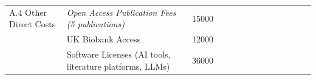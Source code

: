 \begin{table}[]
\begin{tabular}{llllrrrrcrrrrrr}
A.4 Other Direct Costs                                   & \multicolumn{2}{l}{\cellcolor[HTML]{FFFF99}\textit{Open Access Publication Fees (5 publications)}}              & \multicolumn{1}{r}{\cellcolor[HTML]{FFFF99}15000} & \cellcolor[HTML]{FFFF99}                              & \cellcolor[HTML]{FFFF99}\textit{}                     & \cellcolor[HTML]{FFFF99}\textit{}                     & \textit{}                                             & \cellcolor[HTML]{FFFF99}\textit{}                     & \cellcolor[HTML]{92D050}\textit{\textbf{}}                     & \cellcolor[HTML]{FFFF99}\textit{\textbf{}}                     & \cellcolor[HTML]{92D050}\textit{}                     & \cellcolor[HTML]{FFFF99}\textit{}                     & \cellcolor[HTML]{BFBFBF}\textit{\textbf{}}                        & \textit{\textbf{}}                                             \\
\rowcolor[HTML]{FFFF99} 
\cellcolor[HTML]{0070C0}{\color[HTML]{FFFFFF} \textbf{}} & \multicolumn{2}{l}{\cellcolor[HTML]{FFFF99}UK Biobank Access}                                                   & \multicolumn{1}{r}{\cellcolor[HTML]{FFFF99}12000} &                                                       & \textit{}                                             & \textit{}                                             & \cellcolor[HTML]{0070C0}\textit{}                     & \textit{}                                             & \cellcolor[HTML]{92D050}\textit{\textbf{}}                     & \textit{\textbf{}}                                             & \cellcolor[HTML]{92D050}\textit{}                     & {\color[HTML]{FFFFFF} \textit{\textbf{}}}             & \cellcolor[HTML]{BFBFBF}{\color[HTML]{FFFFFF} \textit{\textbf{}}} & \cellcolor[HTML]{0070C0}{\color[HTML]{FFFFFF} \textbf{}}       \\
\rowcolor[HTML]{0070C0} 
{\color[HTML]{FFFFFF} \textbf{}}                         & Software Licenses (AI tools, literature platforms, LLMs)      & \multicolumn{1}{r}{\cellcolor[HTML]{0070C0}}    & \multicolumn{1}{r}{\cellcolor[HTML]{0070C0}36000} &                                                       & \multicolumn{1}{l}{\cellcolor[HTML]{0070C0}}          & \multicolumn{1}{l}{\cellcolor[HTML]{0070C0}}          & \multicolumn{1}{l}{\cellcolor[HTML]{0070C0}}          & {\color[HTML]{FFFFFF} \textbf{}}                      & {\color[HTML]{FFFFFF} \textbf{}}                               & {\color[HTML]{FFFFFF} \textbf{}}                               & \multicolumn{1}{l}{\cellcolor[HTML]{0070C0}}          & {\color[HTML]{FFFFFF} \textbf{}}                      & {\color[HTML]{FFFFFF} \textbf{}}                                  & {\color[HTML]{FFFFFF} \textbf{}}                               \\

\end{tabular}
\end{table}
